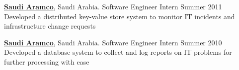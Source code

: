 \documentclass[margin]{resume2}
\begin{document}
\begin{resume}
                        {\bf \href{https://www.saudiaramco.com/}{Saudi Aramco}}, Saudi Arabia. Software Engineer Intern
                        \hfill Summer 2011\\
                        Developed a distributed key-value store system to monitor IT incidents and infrastructure change requests

                        {\bf \href{https://www.saudiaramco.com/}{Saudi Aramco}}, Saudi Arabia. Software Engineer Intern
                        \hfill Summer 2010\\
                        Developed a database system to collect and log reports on IT problems for further processing with ease
%


\end{resume}
\end{document}
